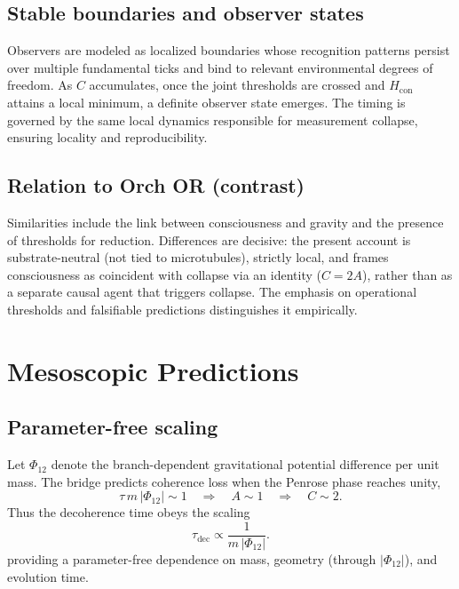 \documentclass[reprint,aps,prd,nofootinbib]{revtex4-2}
\begin{document}
\subsection{Stable boundaries and observer states}
Observers are modeled as localized boundaries whose recognition patterns persist over multiple fundamental ticks and bind to relevant environmental degrees of freedom. As $C$ accumulates, once the joint thresholds are crossed and $H_{\mathrm{con}}$ attains a local minimum, a definite observer state emerges. The timing is governed by the same local dynamics responsible for measurement collapse, ensuring locality and reproducibility.

\subsection{Relation to Orch OR (contrast)}
Similarities include the link between consciousness and gravity and the presence of thresholds for reduction. Differences are decisive: the present account is substrate-neutral (not tied to microtubules), strictly local, and frames consciousness as coincident with collapse via an identity ($C=2A$), rather than as a separate causal agent that triggers collapse. The emphasis on operational thresholds and falsifiable predictions distinguishes it empirically.

\section{Mesoscopic Predictions}
\label{sec:meso}

\subsection{Parameter-free scaling}
Let $\Phi_{12}$ denote the branch-dependent gravitational potential difference per unit mass. The bridge predicts coherence loss when the Penrose phase reaches unity,
\begin{equation}
  \tau\,m\,|\Phi_{12}|\sim 1\quad\Longrightarrow\quad A\sim 1\quad\Longrightarrow\quad C\sim 2.\label{eq:phase-one}
\end{equation}
Thus the decoherence time obeys the scaling
\begin{equation}
  \tau_{\mathrm{dec}}\propto \frac{1}{m\,|\Phi_{12}|}.\label{eq:tau-scaling}
\end{equation}
providing a parameter-free dependence on mass, geometry (through $|\Phi_{12}|$), and evolution time.
\end{document}
